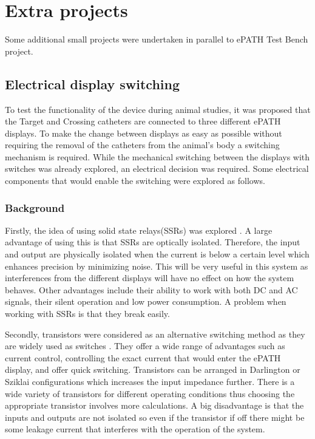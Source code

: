 \section{Extra projects}

Some additional small projects were undertaken in parallel to ePATH Test Bench project.

\subsection{Electrical display switching}
To test the functionality of the device during animal studies, it was proposed that the Target and Crossing catheters are connected to three different ePATH displays. To make the change between displays as easy as possible without requiring the removal of the catheters from the animal's body a switching mechanism is required. While the mechanical switching between the displays with switches was already explored, an electrical decision was required. Some electrical components that would enable the switching were explored as follows.

\subsubsection{Background}
Firstly, the idea of using solid state relays(SSRs) was explored \cite{ssr_rfwireless}. A large advantage of using this is that SSRs are optically isolated. Therefore, the input and output are physically isolated when the current is below a certain level which enhances precision by minimizing noise. This will be very useful in this system as interferences from the different displays will have no effect on how the system behaves. Other advantages include their ability to work with both DC and AC signals, their silent operation and low power consumption. A problem when working with SSRs is that they break easily. 

Secondly, transistors were considered as an alternative switching method as they are widely used as switches \cite{transistor_switch}.  They offer a wide range of advantages such as current control, controlling the exact current that would enter the ePATH display, and offer quick switching. Transistors can be arranged in Darlington or Sziklai configurations which increases the input impedance further. There is a wide variety of transistors for different operating conditions thus choosing the appropriate transistor involves more calculations. A big disadvantage is that the inputs and outputs are not isolated so even if the transistor if off there might be some leakage current that interferes with the operation of the system.

